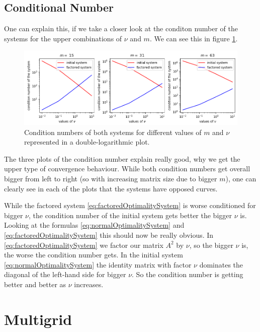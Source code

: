 \documentclass{amsart}
\theoremstyle{definition}
\theoremstyle{remark}
\numberwithin{equation}{section}
\begin{document}
\subsection{Conditional Number}
One can explain this, if we take a closer look at the conditon number of the systems for the upper combinations of $\nu$ and $m$. We can see this in 
figure \ref{fig:CG-conditionNumber}.
\begin{figure}[h!]
\centering
\includegraphics[scale=0.65]{./imgs/CG_conditionNumber}
\caption{Condition numbers of both systems for different values of $m$ and $\nu$ represented in a double-logarithmic plot.}
\label{fig:CG-conditionNumber}
\end{figure}
The three plots of the condition number explain really good, why we get the upper type of convergence behaviour. While both condition numbers get overall
bigger from left to right (so with increasing matrix size due to bigger $m$), one can clearly see in each of the plots that the systems have opposed 
curves.

While the factored system \eqref{eq:factoredOptimalitySystem} is worse conditioned for bigger $\nu$, the condition number of the initial system 
gets better the bigger $\nu$ is. Looking at the formulas \eqref{eq:normalOptimalitySystem} and \eqref{eq:factoredOptimalitySystem} this should now be 
really obvious.
In \eqref{eq:factoredOptimalitySystem} we factor our matrix $A^2$ by $\nu$, so the bigger $\nu$ is, the worse the condition number gets. In the initial 
system \eqref{eq:normalOptimalitySystem} the identity matrix with factor $\nu$ dominates the diagonal of the left-hand side for bigger $\nu$. So the 
condition number is getting better and better as $\nu$ increases.


\section{Multigrid}
\end{document}
